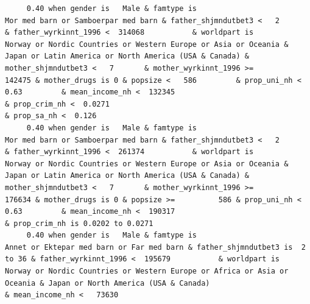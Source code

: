 \documentclass[
  letterpaper,
  DIV=11,
  numbers=noendperiod]{scrreprt}
\begin{document}
\begin{verbatim}
     0.40 when gender is   Male & famtype is                              Mor med barn or Samboerpar med barn & father_shjmndutbet3 <   2       & father_wyrkinnt_1996 <  314068           & worldpart is            Norway or Nordic Countries or Western Europe or Asia or Oceania & Japan or Latin America or North America (USA & Canada) & mother_shjmndutbet3 <   7       & mother_wyrkinnt_1996 >=           142475 & mother_drugs is 0 & popsize <   586         & prop_uni_nh <  0.63         & mean_income_nh <  132345                                        & prop_crim_nh <  0.0271                                                                                                                  & prop_sa_nh <  0.126                                                                                                                                               
     0.40 when gender is   Male & famtype is                              Mor med barn or Samboerpar med barn & father_shjmndutbet3 <   2       & father_wyrkinnt_1996 <  261374           & worldpart is            Norway or Nordic Countries or Western Europe or Asia or Oceania & Japan or Latin America or North America (USA & Canada) & mother_shjmndutbet3 <   7       & mother_wyrkinnt_1996 >=           176634 & mother_drugs is 0 & popsize >=          586 & prop_uni_nh <  0.63         & mean_income_nh <  190317                                        & prop_crim_nh is 0.0202 to 0.0271                                                                                                                                                                                                                                                                            
     0.40 when gender is   Male & famtype is                        Annet or Ektepar med barn or Far med barn & father_shjmndutbet3 is  2 to 36 & father_wyrkinnt_1996 <  195679           & worldpart is                   Norway or Nordic Countries or Western Europe or Africa or Asia or Oceania & Japan or North America (USA & Canada)                                                                                                                                                          & mean_income_nh <   73630                                                                                                                                                                                                                                                                                                                                                      

\end{verbatim}
\end{document}
